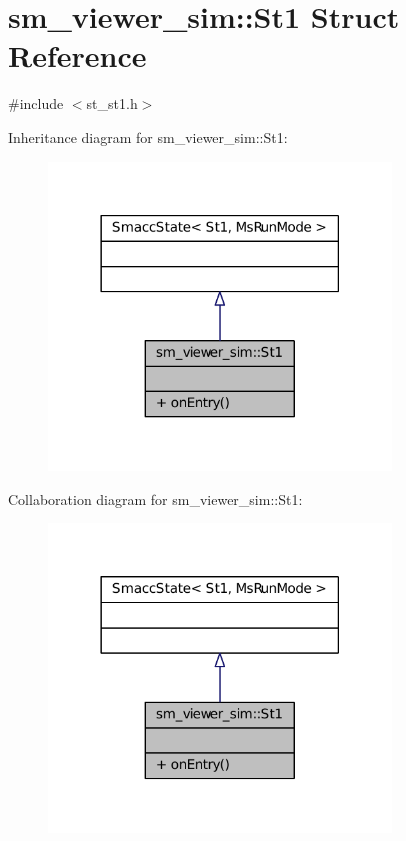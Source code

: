 \hypertarget{structsm__viewer__sim_1_1St1}{}\section{sm\+\_\+viewer\+\_\+sim\+:\+:St1 Struct Reference}
\label{structsm__viewer__sim_1_1St1}


{\ttfamily \#include $<$st\+\_\+st1.\+h$>$}



Inheritance diagram for sm\+\_\+viewer\+\_\+sim\+:\+:St1\+:
\nopagebreak
\begin{figure}[H]
\begin{center}
\leavevmode
\includegraphics[width=258pt]{structsm__viewer__sim_1_1St1__inherit__graph}
\end{center}
\end{figure}


Collaboration diagram for sm\+\_\+viewer\+\_\+sim\+:\+:St1\+:
\nopagebreak
\begin{figure}[H]
\begin{center}
\leavevmode
\includegraphics[width=258pt]{structsm__viewer__sim_1_1St1__coll__graph}
\end{center}
\end{figure}
